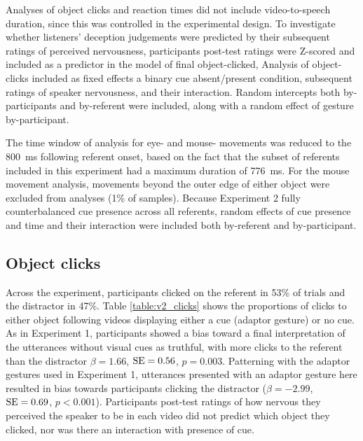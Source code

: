 \documentclass[a4paper,man,natbib]{apa6}
\newcommand{\resultsLog}[3]{$\beta = #1$, $\textnormal{SE} = #2$, $p #3$}
\begin{document}
Analyses of object clicks and reaction times did not include video-to-speech duration, since this was controlled in the experimental design. 
To investigate whether listeners' deception judgements were predicted by their subsequent ratings of perceived nervousness, participants post-test ratings were Z-scored and included as a predictor in the model of final object-clicked,
Analysis of object-clicks included as fixed effects a binary cue absent/present condition, subsequent ratings of speaker nervousness, and their interaction. 
Random intercepts both by-participants and by-referent were included, along with a random effect of gesture by-participant.

The time window of analysis for eye- and mouse- movements was reduced to the 800~ms following referent onset, based on the fact that the subset of referents included in this experiment had a maximum duration of 776~ms. 
For the mouse movement analysis, movements beyond the outer edge of either object were excluded from analyses (1\% of samples).
Because Experiment 2 fully counterbalanced cue presence across all referents, random effects of cue presence and time and their interaction were included both by-referent and by-participant.

\subsection{Object clicks}
Across the experiment, participants clicked on the referent in 53\% of trials and the distractor in 47\%.
Table \ref{table:v2_clicks} shows the proportions of clicks to either object following videos displaying either a cue (adaptor gesture) or no cue.
As in Experiment 1, participants showed a bias toward a final interpretation of the utterances without visual cues as truthful, with more clicks to the referent than the distractor \resultsLog{1.66}{0.56}{=0.003}.
Patterning with the adaptor gestures used in Experiment 1, utterances presented with an adaptor gesture here resulted in bias towards participants clicking the distractor (\resultsLog{-2.99}{0.69}{<0.001}).
Participants post-test ratings of how nervous they perceived the speaker to be in each video did not predict which object they clicked, nor was there an interaction with presence of cue.
\end{document}
